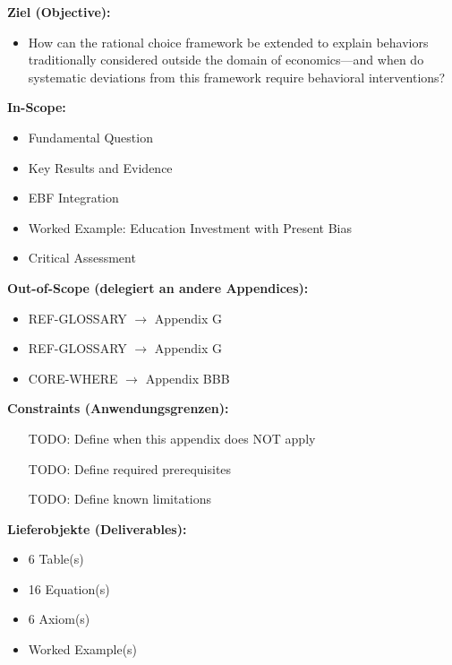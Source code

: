 \begin{tcolorbox}[
    colback=orange!5!white,
    colframe=orange!75!black,
    title={\textbf{Appendix Scope: Ziel / In-Scope / Out-of-Scope / Constraints}},
    fonttitle=\bfseries
]

\textbf{Ziel (Objective):}
\begin{itemize}[nosep]
    \item How can the rational choice framework be extended to explain behaviors traditionally considered outside the domain of economics---and when do systematic deviations from this framework require behavioral interventions?
\end{itemize}

\textbf{In-Scope:}
\begin{itemize}[nosep]
    \item Fundamental Question
    \item Key Results and Evidence
    \item EBF Integration
    \item Worked Example: Education Investment with Present Bias
    \item Critical Assessment
\end{itemize}

\textbf{Out-of-Scope (delegiert an andere Appendices):}
\begin{itemize}[nosep]
    \item REF-GLOSSARY $\rightarrow$ Appendix G
    \item REF-GLOSSARY $\rightarrow$ Appendix G
    \item CORE-WHERE $\rightarrow$ Appendix BBB
\end{itemize}

\textbf{Constraints (Anwendungsgrenzen):}
\begin{itemize}[nosep]
    \item [TODO: Define when this appendix does NOT apply]
    \item [TODO: Define required prerequisites]
    \item [TODO: Define known limitations]
\end{itemize}

\textbf{Lieferobjekte (Deliverables):}
\begin{itemize}[nosep]
    \item 6 Table(s)
    \item 16 Equation(s)
    \item 6 Axiom(s)
    \item Worked Example(s)
\end{itemize}

\end{tcolorbox}


